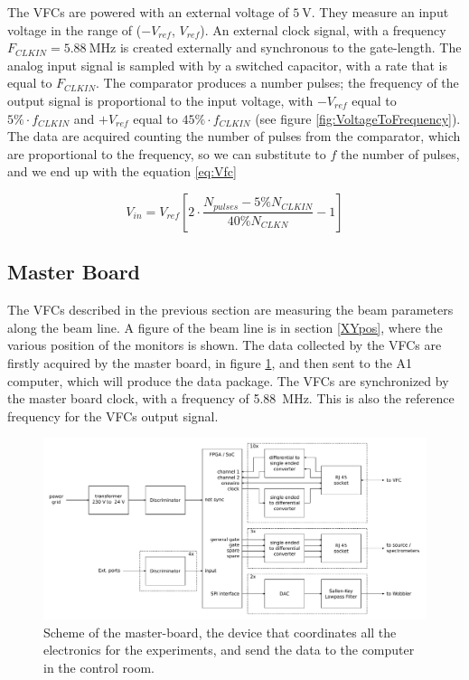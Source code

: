 The VFCs are powered with an external voltage of $\SI{5}{\volt}$. They measure an input voltage in the range of ($-V_{ref}$, $V_{ref}$). An external clock signal, with a frequency $F_{CLKIN} = \SI{5.88}{\mega \hertz}$ is created externally and synchronous to the gate-length.
The analog input signal is sampled with by a switched capacitor, with a rate that is equal to $F_{CLKIN}$.
The comparator produces a number pulses; the frequency of the output signal is proportional to the input voltage, with $-V_{ref}$ equal to $5 \% \cdot f_{CLKIN}$ and $+V_{ref}$ equal to $45 \% \cdot f_{CLKIN}$ \cite{VfcDatasheet} (see figure \ref{fig:VoltageToFrequency}). The data are acquired counting the number of pulses from the comparator, which are proportional to the frequency, so we can substitute to $f$ the number of pulses, and we end up with the equation \ref{eq:Vfc}

\begin{equation} \label{eq:Vfc}
V_{in} =  V_{ref}[2 \cdot \dfrac{N_{pulses} - 5 \% N_{CLKIN}}{40 \% N_{CLKN}} - 1]
\end{equation}

\subsection{Master Board}

The VFCs described in the previous section are measuring the beam parameters along the beam line. A figure of the beam line is in section \ref{XYpos}, where the various position of the monitors is shown.
The data collected by the VFCs are firstly acquired by the master board, in figure \ref{fig:MasterBoard}, and then sent to the A1 computer, which will produce the data package. The VFCs are synchronized by the master board clock, with a frequency of \SI{5.88}{\mega \hertz}. This is also the reference frequency for the VFCs output signal. 

\begin{figure}[hbtp]
\centering
\includegraphics[width = \textwidth]{ExperimentalSetup/masterboard.pdf}
\caption{Scheme of the master-board, the device that coordinates all the electronics for the experiments, and send the data to the computer in the control room.}
\label{fig:MasterBoard}
\end{figure}

